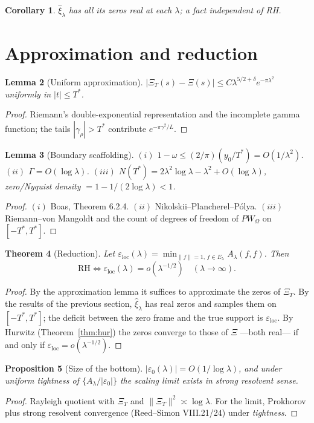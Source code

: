 \documentclass[11pt]{amsart}
\newtheorem{theorem}{Theorem}[section]
\newtheorem{lemma}[theorem]{Lemma}
\newtheorem{proposition}[theorem]{Proposition}
\newtheorem{corollary}[theorem]{Corollary}
\theoremstyle{definition}
\theoremstyle{remark}
\newcommand{\ve}{\varepsilon}
\newcommand{\loc}{\mathrm{loc}}
\begin{document}
\begin{corollary}
$\hat\xi_\lambda$ has all its zeros real at each $\lambda$; a fact independent of RH.
\end{corollary}

\section{Approximation and reduction}

\begin{lemma}[Uniform approximation]
$|\Xi_T(s)-\Xi(s)|\le C\lambda^{5/2+\delta}e^{-\pi\lambda^2}$ uniformly in $|t|\le T^*$.
\end{lemma}
\begin{proof}
Riemann's double-exponential representation and the incomplete gamma function; the tails
$|\gamma_\rho|>T^*$ contribute $e^{-\pi\gamma^2/L}$.
\end{proof}

\begin{lemma}[Boundary scaffolding]
$(i)$ $1-\omega\le(2/\pi)(y_0/T^*)=O(1/\lambda^2)$. $(ii)$ $\Gamma=O(\log\lambda)$.
$(iii)$ $N(T^*)=2\lambda^2\log\lambda-\lambda^2+O(\log\lambda)$, zero/Nyquist density
$=1-1/(2\log\lambda)<1$.
\end{lemma}
\begin{proof}
$(i)$ Boas, Theorem 6.2.4. $(ii)$ Nikolskii--Plancherel--Pólya. $(iii)$ Riemann--von Mangoldt
and the count of degrees of freedom of $PW_\Omega$ on $[-T^*,T^*]$.
\end{proof}

\begin{theorem}[Reduction]\label{thm:red}
Let $\ve_\loc(\lambda)=\min_{\|f\|=1,\,f\in E_\lambda}A_\lambda(f,f)$. Then
\[
\mathrm{RH}\iff \ve_\loc(\lambda)=o(\lambda^{-1/2})\quad(\lambda\to\infty).
\]
\end{theorem}
\begin{proof}
By the approximation lemma it suffices to approximate the zeros of $\Xi_T$. By the results of
the previous section, $\hat\xi_\lambda$ has real zeros and samples them on $[-T^*,T^*]$; the
deficit between the zero frame and the true support is $\ve_\loc$. By Hurwitz
(Theorem~\ref{thm:hur}) the zeros converge to those of $\Xi$ ---both real--- if and only if
$\ve_\loc=o(\lambda^{-1/2})$.
\end{proof}

\begin{proposition}[Size of the bottom]
$|\ve_0(\lambda)|=O(1/\log\lambda)$, and under uniform \emph{tightness} of
$\{A_\lambda/|\ve_0|\}$ the scaling limit exists in strong resolvent sense.
\end{proposition}
\begin{proof}
Rayleigh quotient with $\Xi_T$ and $\|\Xi_T\|^2\asymp\log\lambda$. For the limit, Prokhorov
plus strong resolvent convergence (Reed--Simon VIII.21/24) under \emph{tightness}.
\end{proof}
\end{document}
